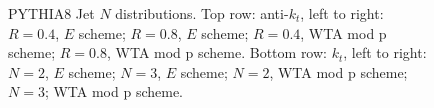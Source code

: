 \begin{figure}[H]
\hfill
{}\hfill
\caption{PYTHIA8 Jet $N$ distributions. Top row: anti-$k_t$, left to right: $R=0.4$, $E$ scheme; $R=0.8$, $E$ scheme; $R=0.4$, WTA mod p scheme; $R=0.8$, WTA mod p scheme. Bottom row: $k_t$, left to right: $N=2$, $E$ scheme; $N=3$, $E$ scheme; $N=2$, WTA mod p scheme; $N=3$; WTA mod p scheme.}  
\end{figure} 

